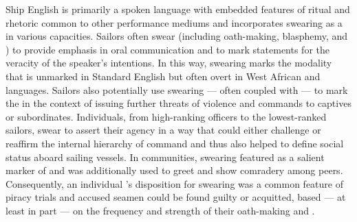 Ship English is primarily a spoken language with embedded features of ritual and rhetoric common to other performance mediums and incorporates swearing as a  in various capacities. Sailors often swear (including oath-making, blasphemy, and ) to provide emphasis in oral communication and to mark statements for the veracity of the speaker’s intentions. In this way, swearing marks the  modality that is unmarked in Standard English but often overt in West African and  languages. Sailors also potentially use swearing — often coupled with  — to mark the  in the context of issuing further threats of violence and commands to captives or subordinates. Individuals, from {high-ranking officers to the lowest-ranked sailors}, swear to assert their agency in a way that could either challenge or reaffirm the internal hierarchy of command and thus also helped to define social status aboard sailing vessels. In  communities, swearing featured as a salient marker of  and was additionally used to greet and show comradery among peers.  Consequently, an individual ’s disposition for swearing was a common feature of piracy trials and accused seamen could be found guilty or acquitted, based — at least in part — on the frequency and strength of their oath-making and . 


